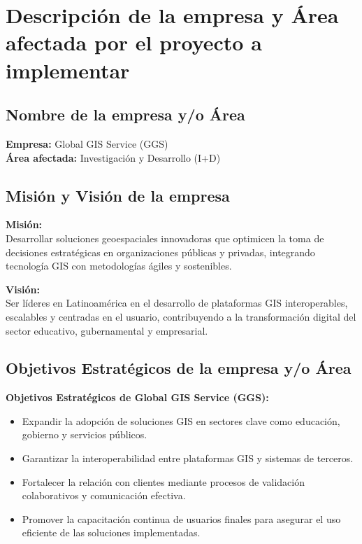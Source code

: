\section{Descripción de la empresa y Área afectada por el proyecto a implementar}

\subsection{Nombre de la empresa y/o Área}
\textbf{Empresa:} Global GIS Service (GGS) \\
\textbf{Área afectada:} Investigación y Desarrollo (I+D)

\subsection{Misión y Visión de la empresa}

\textbf{Misión:} \\
Desarrollar soluciones geoespaciales innovadoras que optimicen la toma de decisiones estratégicas en organizaciones públicas y privadas, integrando tecnología GIS con metodologías ágiles y sostenibles.

\textbf{Visión:} \\
Ser líderes en Latinoamérica en el desarrollo de plataformas GIS interoperables, escalables y centradas en el usuario, contribuyendo a la transformación digital del sector educativo, gubernamental y empresarial.

\subsection{Objetivos Estratégicos de la empresa y/o Área}

\textbf{Objetivos Estratégicos de Global GIS Service (GGS):}
\begin{itemize}
    \item Expandir la adopción de soluciones GIS en sectores clave como educación, gobierno y servicios públicos.
    \item Garantizar la interoperabilidad entre plataformas GIS y sistemas de terceros.
    \item Fortalecer la relación con clientes mediante procesos de validación colaborativos y comunicación efectiva.
    \item Promover la capacitación continua de usuarios finales para asegurar el uso eficiente de las soluciones implementadas.
\end{itemize}

